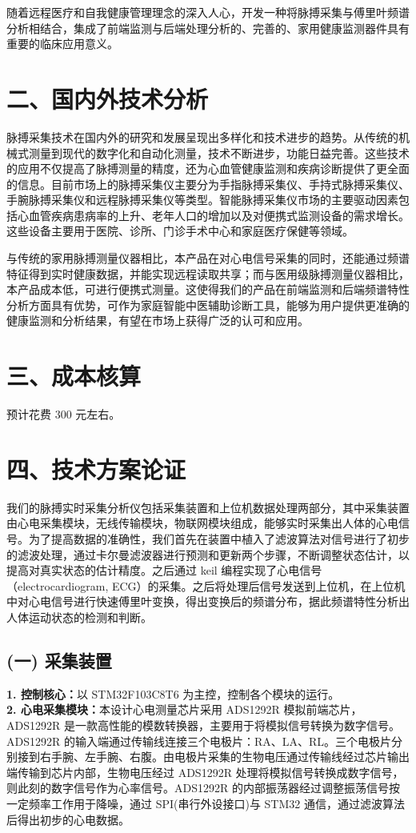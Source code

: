 \documentclass[a4paper,12pt]{article}
\begin{document}
随着远程医疗和自我健康管理理念的深入人心，开发一种将脉搏采集与傅里叶频谱分析相结合，集成了前端监测与后端处理分析的、完善的、家用健康监测器件具有重要的临床应用意义。

\section*{二、国内外技术分析}
脉搏采集技术在国内外的研究和发展呈现出多样化和技术进步的趋势。从传统的机械式测量到现代的数字化和自动化测量，技术不断进步，功能日益完善。这些技术的应用不仅提高了脉搏测量的精度，还为心血管健康监测和疾病诊断提供了更全面的信息。目前市场上的脉搏采集仪主要分为手指脉搏采集仪、手持式脉搏采集仪、手腕脉搏采集仪和远程脉搏采集仪等类型。智能脉搏采集仪市场的主要驱动因素包括心血管疾病患病率的上升、老年人口的增加以及对便携式监测设备的需求增长。这些设备主要用于医院、诊所、门诊手术中心和家庭医疗保健等领域。

与传统的家用脉搏测量仪器相比，本产品在对心电信号采集的同时，还能通过频谱特征得到实时健康数据，并能实现远程读取共享；而与医用级脉搏测量仪器相比，本产品成本低，可进行便携式测量。这使得我们的产品在前端监测和后端频谱特性分析方面具有优势，可作为家庭智能中医辅助诊断工具，能够为用户提供更准确的健康监测和分析结果，有望在市场上获得广泛的认可和应用。

\section*{三、成本核算}
预计花费 300 元左右。

\section*{四、技术方案论证}
我们的脉搏实时采集分析仪包括采集装置和上位机数据处理两部分，其中采集装置由心电采集模块，无线传输模块，物联网模块组成，能够实时采集出人体的心电信号。为了提高数据的准确性，我们首先在装置中植入了滤波算法对信号进行了初步的滤波处理，通过卡尔曼滤波器进行预测和更新两个步骤，不断调整状态估计，以提高对真实状态的估计精度。之后通过 keil 编程实现了心电信号（electrocardiogram, ECG）的采集。之后将处理后信号发送到上位机，在上位机中对心电信号进行快速傅里叶变换，得出变换后的频谱分布，据此频谱特性分析出人体运动状态的检测和判断。

\subsection*{(一) 采集装置}
\textbf{1. 控制核心：}以 STM32F103C8T6 为主控，控制各个模块的运行。\\
\textbf{2. 心电采集模块：}本设计心电测量芯片采用 ADS1292R 模拟前端芯片，ADS1292R 是一款高性能的模数转换器，主要用于将模拟信号转换为数字信号。ADS1292R 的输入端通过传输线连接三个电极片：RA、LA、RL。三个电极片分别接到右手腕、左手腕、右腹。由电极片采集的生物电压通过传输线经过芯片输出端传输到芯片内部，生物电压经过 ADS1292R 处理将模拟信号转换成数字信号，则此刻的数字信号作为心率信号。ADS1292R 的内部振荡器经过调整振荡信号按一定频率工作用于降噪，通过 SPI(串行外设接口)与 STM32 通信，通过滤波算法后得出初步的心电数据。
\end{document}
